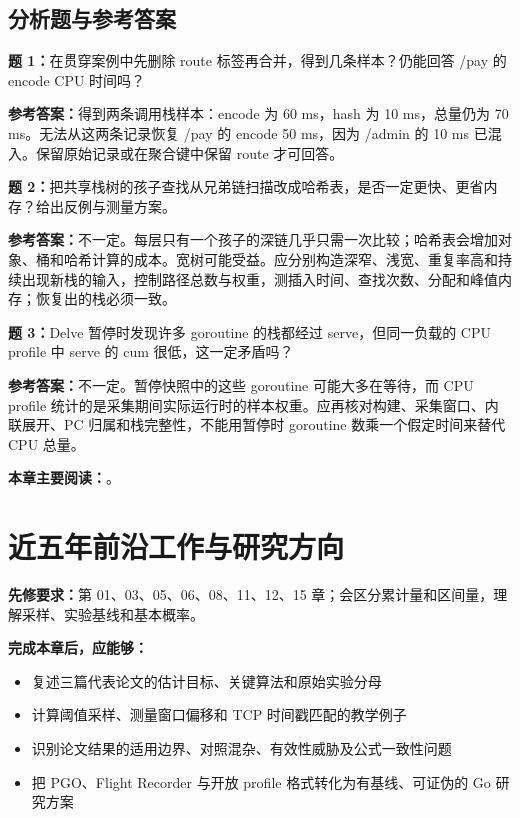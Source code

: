 \documentclass[UTF8,fontset=fandol,openany,11pt]{ctexbook}
\begin{document}
\section{分析题与参考答案}
\noindent\textbf{题 1：}在贯穿案例中先删除 route 标签再合并，得到几条样本？仍能回答 /pay 的 encode CPU 时间吗？

\noindent\textbf{参考答案：}得到两条调用栈样本：encode 为 60 ms，hash 为 10 ms，总量仍为 70 ms。无法从这两条记录恢复 /pay 的 encode 50 ms，因为 /admin 的 10 ms 已混入。保留原始记录或在聚合键中保留 route 才可回答。

\noindent\textbf{题 2：}把共享栈树的孩子查找从兄弟链扫描改成哈希表，是否一定更快、更省内存？给出反例与测量方案。

\noindent\textbf{参考答案：}不一定。每层只有一个孩子的深链几乎只需一次比较；哈希表会增加对象、桶和哈希计算的成本。宽树可能受益。应分别构造深窄、浅宽、重复率高和持续出现新栈的输入，控制路径总数与权重，测插入时间、查找次数、分配和峰值内存；恢复出的栈必须一致。

\noindent\textbf{题 3：}Delve 暂停时发现许多 goroutine 的栈都经过 serve，但同一负载的 CPU profile 中 serve 的 cum 很低，这一定矛盾吗？

\noindent\textbf{参考答案：}不一定。暂停快照中的这些 goroutine 可能大多在等待，而 CPU profile 统计的是采集期间实际运行时的样本权重。应再核对构建、采集窗口、内联展开、PC 归属和栈完整性，不能用暂停时 goroutine 数乘一个假定时间来替代 CPU 总量。

\medskip\noindent\textbf{本章主要阅读：}\cite{proj-pprof}\cite{proj-pprof-model}\cite{proj-pprof-merge}\cite{proj-delve}\cite{proj-delve-stack}\cite{proj-pyroscope}\cite{proj-pyroscope-store}\cite{proj-pyro-tree}\cite{proj-pyro-delta}\cite{proj-parca}\cite{proj-parca-store}\cite{proj-parca-query}\cite{proj-parca-agent}\cite{proj-otel-ebpf}\cite{proj-ebpf-unwind}\cite{proj-go-unwind}。
\chapter{近五年前沿工作与研究方向}
\label{ch:16}
\par\medskip
\noindent\textbf{先修要求：}第 01、03、05、06、08、11、12、15 章；会区分累计量和区间量，理解采样、实验基线和基本概率。

\noindent\textbf{完成本章后，应能够：}
\begin{itemize}
\item 复述三篇代表论文的估计目标、关键算法和原始实验分母
\item 计算阈值采样、测量窗口偏移和 TCP 时间戳匹配的教学例子
\item 识别论文结果的适用边界、对照混杂、有效性威胁及公式一致性问题
\item 把 PGO、Flight Recorder 与开放 profile 格式转化为有基线、可证伪的 Go 研究方案
\end{itemize}
\end{document}
